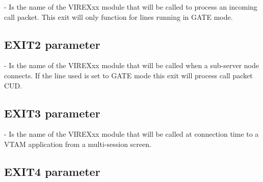\documentclass[letterpaper,10pt,english]{sphinxmanual}
\begin{document}
 - Is the name of the VIREXxx module that will be called to process an incoming call packet. This exit will only function for lines running in GATE mode.


\subsection{EXIT2 parameter}
\label{\detokenize{Installation_Guide:exit2-parameter}}\label{\detokenize{Installation_Guide:index-55}}
\begin{sphinxVerbatim}[commandchars=\\\{\}]
 
\end{sphinxVerbatim}

 - Is the name of the VIREXxx module that will be called when a sub-server node connects. If the line used is set to GATE mode this exit will process call packet CUD.


\subsection{EXIT3 parameter}
\label{\detokenize{Installation_Guide:index-56}}\label{\detokenize{Installation_Guide:exit3-parameter}}
\begin{sphinxVerbatim}[commandchars=\\\{\}]
 
\end{sphinxVerbatim}

 - Is the name of the VIREXxx module that will be called at connection time to a VTAM application from a multi-session screen.


\subsection{EXIT4 parameter}
\label{\detokenize{Installation_Guide:exit4-parameter}}\label{\detokenize{Installation_Guide:index-57}}
\begin{sphinxVerbatim}[commandchars=\\\{\}]
 
\end{sphinxVerbatim}
\end{document}
